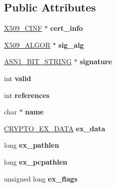 \subsection*{Public Attributes}
\begin{DoxyCompactItemize}
\item 
\mbox{\label{structx509__st_abbae6a9fb14b3145b04b98f24128be71}} 
\hyperlink{structx509__cinf__st}{X509\+\_\+\+C\+I\+NF} $\ast$ {\bfseries cert\+\_\+info}
\item 
\mbox{\label{structx509__st_a90d06c88fff740923082fa98b7b86b27}} 
\hyperlink{struct_x509__algor__st}{X509\+\_\+\+A\+L\+G\+OR} $\ast$ {\bfseries sig\+\_\+alg}
\item 
\mbox{\label{structx509__st_a8a1e43923e1855fb1dbfe15730cd5e7f}} 
\hyperlink{structasn1__string__st}{A\+S\+N1\+\_\+\+B\+I\+T\+\_\+\+S\+T\+R\+I\+NG} $\ast$ {\bfseries signature}
\item 
\mbox{\label{structx509__st_a1e506073c0b53c10a6007f5fa9428c35}} 
int {\bfseries valid}
\item 
\mbox{\label{structx509__st_ab1114b325664bca1cdfd6854f247a4d5}} 
int {\bfseries references}
\item 
\mbox{\label{structx509__st_a447f3d7de20099a3a45fcc361a2d8f02}} 
char $\ast$ {\bfseries name}
\item 
\mbox{\label{structx509__st_a388ec405fa7f267e4ce5fbcbc9ccbc91}} 
\hyperlink{structcrypto__ex__data__st}{C\+R\+Y\+P\+T\+O\+\_\+\+E\+X\+\_\+\+D\+A\+TA} {\bfseries ex\+\_\+data}
\item 
\mbox{\label{structx509__st_a9e9ea838b4395a05a70485526f05a152}} 
long {\bfseries ex\+\_\+pathlen}
\item 
\mbox{\label{structx509__st_a80c2e990274c6d80a0d2e8bc87850d59}} 
long {\bfseries ex\+\_\+pcpathlen}
\item 
\mbox{\label{structx509__st_afc5106add019789df9b25ab6a1ff07ce}} 
unsigned long {\bfseries ex\+\_\+flags}
\item 

\end{DoxyCompactItemize}
